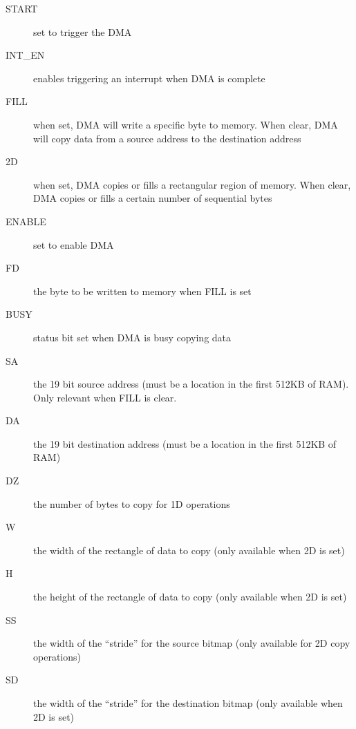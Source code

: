 \begin{description}
    \item[START] set to trigger the DMA

    \item[INT\_EN] enables triggering an interrupt when DMA is complete

    \item[FILL] when set, DMA will write a specific byte to memory. When clear, DMA will copy data from a source address to the destination address

    \item[2D] when set, DMA copies or fills a rectangular region of memory. When clear, DMA copies or fills a certain number of sequential bytes

    \item[ENABLE] set to enable DMA

    \item[FD] the byte to be written to memory when FILL is set

    \item[BUSY] status bit set when DMA is busy copying data

    \item[SA] the 19 bit source address (must be a location in the first 512KB of RAM). Only relevant when FILL is clear.

    \item[DA] the 19 bit destination address (must be a location in the first 512KB of RAM)

    \item[DZ] the number of bytes to copy for 1D operations

    \item[W] the width of the rectangle of data to copy (only available when 2D is set)

    \item[H] the height of the rectangle of data to copy (only available when 2D is set)

    \item[SS] the width of the ``stride'' for the source bitmap (only available for 2D copy operations)

    \item[SD] the width of the ``stride'' for the destination bitmap (only available when 2D is set)
\end{description}

